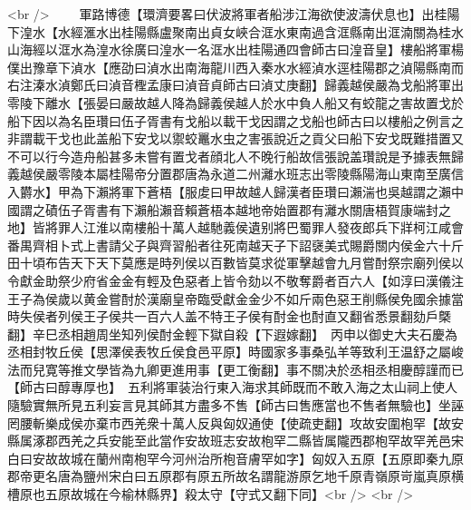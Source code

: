 <br />
　　軍路博德【環濟要畧曰伏波將軍者船涉江海欲使波濤伏息也】出桂陽下湟水【水經滙水出桂陽縣盧聚南出貞女峽合洭水東南過含洭縣南出洭湳關為桂水山海經以洭水為湟水徐廣曰湟水一名洭水出桂陽通四會師古曰湟音皇】樓船將軍楊僕出豫章下湞水【應劭曰湞水出南海龍川西入秦水水經湞水逕桂陽郡之湞陽縣南而右注溱水湞鄭氏曰湞音檉孟康曰湞音貞師古曰湞丈庚翻】歸義越侯嚴為戈船將軍出零陵下離水【張晏曰嚴故越人降為歸義侯越人於水中負人船又有蛟龍之害故置戈於船下因以為名臣瓚曰伍子胥書有戈船以載干戈因謂之戈船也師古曰以樓船之例言之非謂載干戈也此盖船下安戈以禦蛟鼉水虫之害張說近之貢父曰船下安戈既難措置又不可以行今造舟船甚多未嘗有置戈者顔北人不晚行船故信張說盖瓚說是予據表無歸義越侯嚴零陵本屬桂陽帝分置郡唐為永道二州灕水班志出零陵縣陽海山東南至廣信入欝水】甲為下瀨將軍下蒼梧【服䖍曰甲故越人歸漢者臣瓚曰瀨湍也吳越謂之瀨中國謂之磧伍子胥書有下瀨船瀨音賴蒼梧本越地帝始置郡有灕水關唐梧賀康端封之地】皆將罪人江淮以南樓船十萬人越馳義侯遺别將巴蜀罪人發夜郎兵下牂柯江咸會番禺齊相卜式上書請父子與齊習船者往死南越天子下詔襃美式賜爵關内侯金六十斤田十頃布告天下天下莫應是時列侯以百數皆莫求從軍擊越會九月嘗酎祭宗廟列侯以令獻金助祭少府省金金有輕及色惡者上皆令劾以不敬奪爵者百六人【如淳曰漢儀注王子為侯歲以黄金嘗酎於漢廟皇帝臨受獻金金少不如斤兩色惡王削縣侯免國余據當時失侯者列侯王子侯共一百六人盖不特王子侯有酎金也酎直又翻省悉景翻劾戶槩翻】辛巳丞相趙周坐知列侯酎金輕下獄自殺【下遐嫁翻】　丙申以御史大夫石慶為丞相封牧丘侯【思澤侯表牧丘侯食邑平原】時國家多事桑弘羊等致利王温舒之屬峻法而兒寛等推文學皆為九卿更進用事【更工衡翻】事不關决於丞相丞相慶醇謹而已【師古曰醇專厚也】　五利將軍装治行東入海求其師既而不敢入海之太山祠上使人隨驗實無所見五利妄言見其師其方盡多不售【師古曰售應當也不售者無驗也】坐誣罔腰斬樂成侯亦棄市西羌衆十萬人反與匈奴通使【使疏吏翻】攻故安圍枹罕【故安縣属涿郡西羌之兵安能至此當作安故班志安故枹罕二縣皆属隴西郡枹罕故罕羌邑宋白曰安故故城在蘭州南枹罕今河州治所枹音膚罕如字】匈奴入五原【五原即秦九原郡帝更名唐為鹽州宋白曰五原郡有原五所故名謂龍游原乞地千原青嶺原岢嵐真原横槽原也五原故城在今榆林縣界】殺太守【守式又翻下同】<br />
<br />
